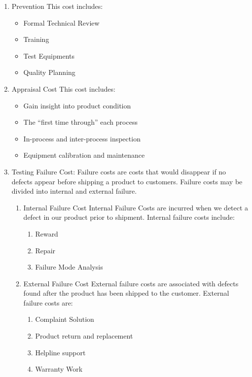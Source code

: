 \documentclass[11pt]{article}
\begin{document}
\begin{enumerate}
\item Prevention
\label{sec:org42a165d}
This cost includes:
\begin{itemize}
\item Formal Technical Review
\item Training
\item Test Equipments
\item Quality Planning
\end{itemize}
\item Appraisal Cost
\label{sec:orgb5b56e5}
This cost includes:
\begin{itemize}
\item Gain insight into product condition
\item The “first time through” each process
\item In-process and inter-process inspection
\item Equipment calibration and maintenance
\end{itemize}
\item Testing
\label{sec:org39b6cab}
Failure Cost: Failure costs are costs that would disappear if no defects appear before shipping a product to customers. Failure costs may be divided into internal and external failure.

\begin{enumerate}
\item Internal Failure Cost
\label{sec:org9e49caf}
Internal Failure Costs are incurred when we detect a defect in our product prior to shipment. Internal failure costs include:
\begin{enumerate}
\item Reward
\item Repair
\item Failure Mode Analysis
\end{enumerate}

\item External Failure Cost
\label{sec:org1230137}
External failure costs are associated with defects found after the product has been shipped to the customer. External failure costs are:
\begin{enumerate}
\item Complaint Solution
\item Product return and replacement
\item Helpline support
\item Warranty Work
\end{enumerate}
\end{enumerate}
\end{enumerate}
\end{document}
